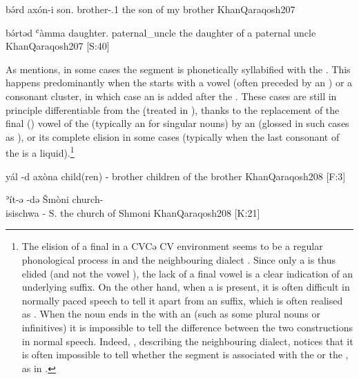 {bə́rd axón-i}
{son.\cst{} brother-\poss.1\sg{}}
{the son of my brother}
{KhanQaraqosh}{207}

{bə́rtəd ʿàmma}
{daughter.\cst{} paternal\_uncle}
{the daughter of a paternal uncle}
{KhanQaraqosh}{207 {[S:40]}}

As \citet[208]{KhanQaraqosh} mentions, in some cases the  segment is phonetically syllabified with the \secn. This happens predominantly when the \secn starts with a vowel (often preceded by an  ) or a consonant cluster, in which case an  \phonetic[ə] is added after the . These cases are still in principle differentiable from the \lnk* \d (treated in ), thanks to the replacement of the final (\free*) vowel of the \prim (typically an  for singular nouns) by an \phonetic[ə] (glossed in such cases as ), or its complete elision in some cases (typically when the last consonant of the \prim is a liquid).\footnote{The elision of a final  in a CVCə CV environment seems to be a regular phonological process in \Qar and the neighbouring \Alq dialect \citep[cf.][73]{CoghillAlqosh}. Since only a  is thus elided (and not the vowel \phonetic[a]), the lack of a final vowel is a clear indication of an underlying \ed suffix. On the other hand, when a  is present,  it is often difficult in normally paced speech to tell it apart from an  suffix, which is often realised as \phonetic[æ]. When the \prim noun ends in the \free* with an \phonetic[ə] (such as some plural nouns or infinitives) it is impossible to tell the difference between the two constructions in normal speech.  Indeed, \citet[298]{CoghillAlqosh}, describing the neighbouring \Alq dialect, notices that it is often impossible to tell whether the  segment is associated with the \prim or the \secn, as in . }


{yál -d\cb{} axòna}
{child(ren) -\cst\cb{} brother}
{children of the brother}
{KhanQaraqosh}{208 {[F:3]}}

{ʾít-ə -də\cb{} Šmòni\footnotemark}
{church-\\isi{schwa}{} -\cst\cb{} S.}
{the church of Shmoni}
{KhanQaraqosh}{208 {[K:21]}}


